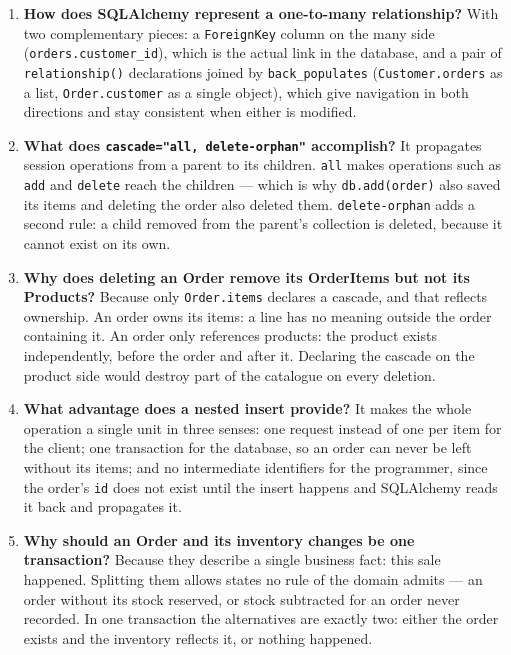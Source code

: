 \documentclass[10pt,a4paper]{article}
\begin{document}
\begin{enumerate}[leftmargin=0.7cm]
\item \textbf{How does SQLAlchemy represent a one-to-many relationship?} With
two complementary pieces: a \texttt{ForeignKey} column on the many side
(\texttt{orders.customer\_id}), which is the actual link in the database, and a
pair of \texttt{relationship()} declarations joined by \texttt{back\_populates}
(\texttt{Customer.orders} as a list, \texttt{Order.customer} as a single
object), which give navigation in both directions and stay consistent when
either is modified.

\item \textbf{What does \texttt{cascade="all, delete-orphan"} accomplish?} It
propagates session operations from a parent to its children. \texttt{all} makes
operations such as \texttt{add} and \texttt{delete} reach the children --- which
is why \texttt{db.add(order)} also saved its items and deleting the order also
deleted them. \texttt{delete-orphan} adds a second rule: a child removed from
the parent's collection is deleted, because it cannot exist on its own.

\item \textbf{Why does deleting an Order remove its OrderItems but not its
Products?} Because only \texttt{Order.items} declares a cascade, and that
reflects ownership. An order owns its items: a line has no meaning outside the
order containing it. An order only references products: the product exists
independently, before the order and after it. Declaring the cascade on the
product side would destroy part of the catalogue on every deletion.

\item \textbf{What advantage does a nested insert provide?} It makes the whole
operation a single unit in three senses: one request instead of one per item for
the client; one transaction for the database, so an order can never be left
without its items; and no intermediate identifiers for the programmer, since the
order's \texttt{id} does not exist until the insert happens and SQLAlchemy reads
it back and propagates it.

\item \textbf{Why should an Order and its inventory changes be one
transaction?} Because they describe a single business fact: this sale happened.
Splitting them allows states no rule of the domain admits --- an order without
its stock reserved, or stock subtracted for an order never recorded. In one
transaction the alternatives are exactly two: either the order exists and the
inventory reflects it, or nothing happened.


\end{enumerate}
\end{document}
